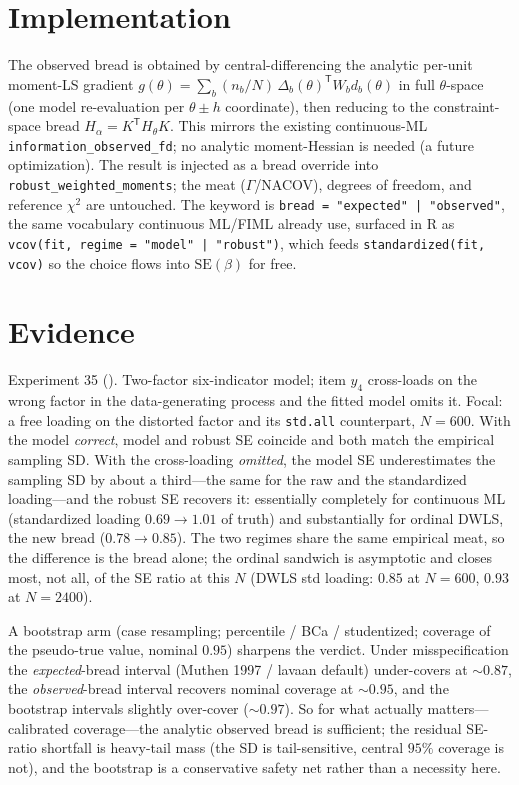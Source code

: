 \documentclass[11pt]{article}
\newcommand{\T}{^{\mathsf T}}
\begin{document}
\section*{Implementation}

The observed bread is obtained by central-differencing the analytic per-unit
moment-LS gradient $g(\theta)=\sum_b (n_b/N)\,\Delta_b(\theta)\T W_b d_b(\theta)$
in full $\theta$-space (one model re-evaluation per $\theta\pm h$ coordinate),
then reducing to the constraint-space bread $H_\alpha=K\T H_\theta K$. This
mirrors the existing continuous-ML \texttt{information\_observed\_fd}; no analytic
moment-Hessian is needed (a future optimization). The result is injected as a
bread override into \texttt{robust\_weighted\_moments}; the meat ($\Gamma$/NACOV),
degrees of freedom, and reference $\chi^2$ are untouched. The keyword is
\texttt{bread = "expected" | "observed"}, the same vocabulary continuous ML/FIML
already use, surfaced in R as \texttt{vcov(fit, regime = "model" | "robust")},
which feeds \texttt{standardized(fit, vcov)} so the choice flows into
$\mathrm{SE}(\beta)$ for free.

\section*{Evidence}

Experiment 35 (). Two-factor
six-indicator model; item $y_4$ cross-loads on the wrong factor in the
data-generating process and the fitted model omits it. Focal: a free loading on
the distorted factor and its \texttt{std.all} counterpart, $N=600$. With the
model \emph{correct}, model and robust SE coincide and both match the empirical
sampling SD. With the cross-loading \emph{omitted}, the model SE underestimates
the sampling SD by about a third---the same for the raw and the standardized
loading---and the robust SE recovers it: essentially completely for continuous
ML (standardized loading $0.69\to1.01$ of truth) and substantially for ordinal
DWLS, the new bread ($0.78\to0.85$). The two regimes share the same empirical
meat, so the difference is the bread alone; the ordinal sandwich is asymptotic
and closes most, not all, of the SE ratio at this $N$ (DWLS std loading: $0.85$
at $N=600$, $0.93$ at $N=2400$).

A bootstrap arm (case resampling; percentile / BCa / studentized; coverage of
the pseudo-true value, nominal $0.95$) sharpens the verdict. Under
misspecification the \emph{expected}-bread interval (Muthen 1997 / lavaan
default) under-covers at $\sim0.87$, the \emph{observed}-bread interval recovers
nominal coverage at $\sim0.95$, and the bootstrap intervals slightly over-cover
($\sim0.97$). So for what actually matters---calibrated coverage---the analytic
observed bread is sufficient; the residual SE-ratio shortfall is heavy-tail mass
(the SD is tail-sensitive, central $95\%$ coverage is not), and the bootstrap is
a conservative safety net rather than a necessity here.
\end{document}
